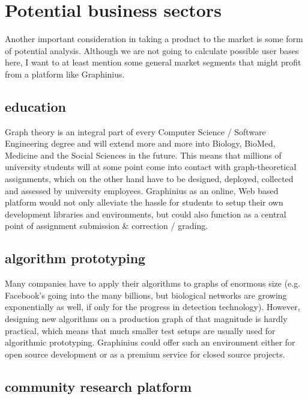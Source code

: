 \section{Potential business sectors}
\label{sect:business_sectors}

	Another important consideration in taking a product to the market is some form of potential analysis. Although we are not going to calculate possible user bases here, I want to at least mention some general market segments that might profit from a platform like Graphinius.

	\subsection{education}
	\label{ssect:education}
	
	Graph theory is an integral part of every Computer Science / Software Engineering degree and will extend more and more into Biology, BioMed, Medicine and the Social Sciences in the future. This means that millions of university students will at some point come into contact with graph-theoretical assignments, which on the other hand have to be designed, deployed, collected and assessed by university employees. Graphinius as an online, Web based platform would not only alleviate the hassle for students to setup their own development libraries and environments, but could also function as a central point of assignment submission \& correction / grading. 
	
	\subsection{algorithm prototyping}
	\label{ssect:algo_proto}
	
	Many companies have to apply their algorithms to graphs of enormous size (e.g. Facebook's going into the many billions, but biological networks are growing exponentially as well, if only for the progress in detection technology). However, designing new algorithms on a production graph of that magnitude is hardly practical, which means that much smaller test setups are usually used for algorithmic prototyping. Graphinius could offer such an environment either for open source development or as a premium service for closed source projects.
	
	\subsection{community research platform}
	\label{ssect:research}
	
